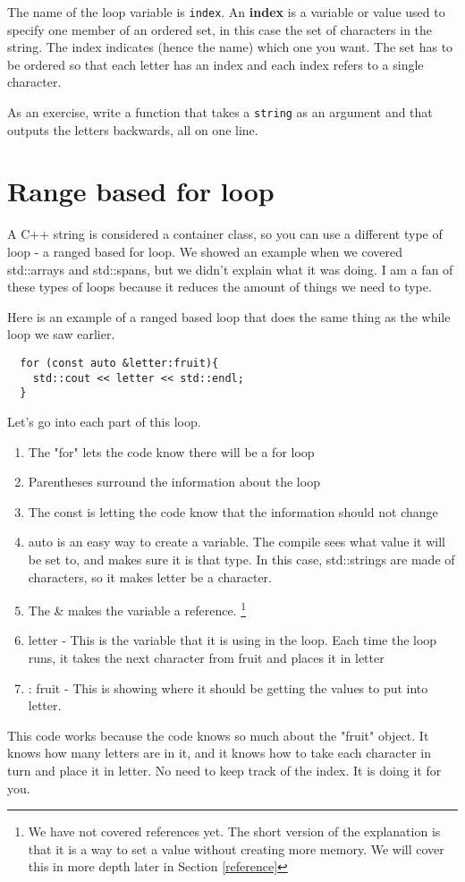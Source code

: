
The name of the loop variable is {\tt index}.  An {\bf
index} is a variable or value used to specify one member of an ordered
set, in this case the set of characters in the string.  The index
indicates (hence the name) which one you want.  The set has to be
ordered so that each letter has an index and each index
refers to a single character.

As an exercise, write a function that takes a {\tt string}
as an argument and that outputs the letters backwards, all on
one line.
\section{Range based for loop}
A C++ string is considered a container class, so you can
use a different type of loop - a ranged based for loop. 
We showed an example when we covered std::arrays and std::spans, but we
didn't explain what it was doing. I am a fan of these types of
loops because it reduces the amount of things we need to type.

Here is an example of a ranged based loop that does the same
thing as the while loop we saw earlier.
\begin{verbatim}
  for (const auto &letter:fruit){
    std::cout << letter << std::endl;
  }
\end{verbatim}
Let's go into each part of this loop. 
\begin{enumerate}
    \item The "for" lets the code know there will be a for loop
    \item Parentheses surround the information about the loop
    \item The const is letting the code know that the information should not change
    \item auto is an easy way to create a variable. The compile sees what value it
    will be set to, and makes sure it is that type. In this case, std::strings are
    made of characters, so it makes letter be a character.
    \item The \& makes the variable a reference. \footnote{We have not covered references yet. The short version of the explanation is that it is a way to set a value without
    creating more memory. We will cover this in more depth later in Section \ref{reference}}
    \item letter - This is the variable that it is using in the loop. Each time the 
    loop runs, it takes the next character from fruit and places it in letter
    \item : fruit - This is showing where it should be getting the values to 
    put into letter.
\end{enumerate}
This code works because the code knows so much about the "fruit" object. It knows
how many letters are in it, and it knows how to take each character in turn and place it
in letter. No need to keep track of the index. It is doing it for you.

